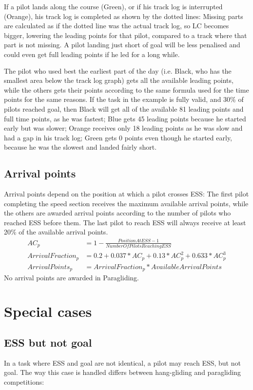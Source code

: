 \documentclass{article}
\begin{document}
If a pilot lands along the course (Green), or if his track log is interrupted (Orange), his track log is
completed as shown by the dotted lines: Missing parts are calculated as if the dotted line was the actual
track log, so LC becomes bigger, lowering the leading points for that pilot, compared to a track where
that part is not missing. A pilot landing just short of goal will be less penalised and could even get full
leading points if he led for a long while.

The pilot who used best the earliest part of the day (i.e. Black, who has the smallest area below the
track log graph) gets all the available leading points, while the others gets their points according to the
same formula used for the time points for the same reasons. If the task in the example is fully valid, and
30\% of pilots reached goal, then Black will get all of the available 81 leading points and full time points,
as he was fastest; Blue gets 45 leading points because he started early but was slower; Orange receives
only 18 leading points as he was slow and had a gap in his track log; Green gets 0 points even though he
started early, because he was the slowest and landed fairly short.

\subsection{Arrival points}
Arrival points depend on the position at which a pilot crosses ESS: The first pilot completing the speed
section receives the maximum available arrival points, while the others are awarded arrival points
according to the number of pilots who reached ESS before them. The last pilot to reach ESS will always
receive at least 20\% of the available arrival points.
\begin{align*}
    AC_p &= 1 - \frac{PositionAtESS - 1}{NumberOfPilotsReachingESS} \\
    ArrivalFraction_p &= 0.2 + 0.037 * AC_p + 0.13 * AC_p^2 + 0.633 * AC_p^3 \\
    ArrivalPoints_p &= ArrivalFraction_p * AvailableArrivalPoints
\end{align*}
No arrival points are awarded in Paragliding.

\newpage
\section{Special cases}
\subsection{ESS but not goal}
In a task where ESS and goal are not identical, a pilot may reach ESS, but not goal. The way this case is
handled differs between hang-gliding and paragliding competitions:
\end{document}
